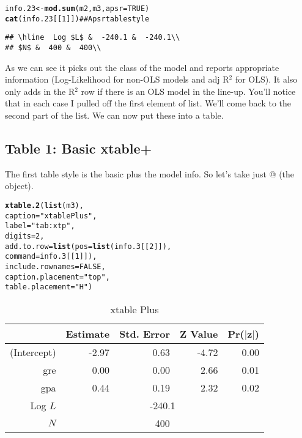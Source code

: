 \documentclass{article}\usepackage{graphicx, color}
\makeatletter
\newcommand{\hlfunctioncall}[1]{\textcolor[rgb]{0.501960784313725,0,0.329411764705882}{\textbf{#1}}}%
\newcommand{\hlstring}[1]{\textcolor[rgb]{0.6,0.6,1}{#1}}%
\newcommand{\hlcomment}[1]{\textcolor[rgb]{0.180392156862745,0.6,0.341176470588235}{#1}}%
\newenvironment{kframe}{%
 \def\at@end@of@kframe{}%
 \ifinner\ifhmode%
  \def\at@end@of@kframe{\end{minipage}}%
  \begin{minipage}{\columnwidth}%
 \fi\fi%
 \def\FrameCommand##1{\hskip\@totalleftmargin \hskip-\fboxsep
 \colorbox{shadecolor}{##1}\hskip-\fboxsep
     \hskip-\linewidth \hskip-\@totalleftmargin \hskip\columnwidth}%
 \MakeFramed {\advance\hsize-\width
   \@totalleftmargin\z@ \linewidth\hsize
   \@setminipage}}%
 {\par\unskip\endMakeFramed%
 \at@end@of@kframe}
\newenvironment{knitrout}{}{} %
\makeatother
\begin{document}
\begin{knitrout}
\begin{kframe}
\begin{alltt}
info.23<-\hlfunctioncall{mod.sum}(m2, m3, apsr=TRUE)
\hlfunctioncall{cat}(info.23[[1]]) \hlcomment{##Apsrtable style}
\end{alltt}
\begin{verbatim}
## \hline  Log $L$ &  -240.1 &  -240.1\\
## $N$ &  400 &  400\\
\end{verbatim}
\end{kframe}
\end{knitrout}

As we can see it picks out the class of the model and reports appropriate information (Log-Likelihood for non-OLS models and adj R$^2$ for OLS).  It also only adds in the R$^2$ row if there is an OLS model in the line-up.  You'll notice that in each case I pulled off the first element of list.  We'll come back to the second part of the list.  We can now put these into a table.
\subsection{Table 1: Basic xtable+}
The first table style is the basic \verb@xtable@ plus the model info.  So let's take just @ (the \verb@maxLik@ object).
\begin{kframe}
\begin{alltt}
\hlfunctioncall{xtable.2}(\hlfunctioncall{list}(m3),
         caption=\hlstring{"xtable Plus"},
         label=\hlstring{"tab:xtp"},  
         digits=2,
         add.to.row=\hlfunctioncall{list}(pos=\hlfunctioncall{list}(info.3[[2]]),
                         command=info.3[[1]]),
         include.rownames=FALSE,
         caption.placement=\hlstring{"top"},
         table.placement=\hlstring{"H"})
\end{alltt}
\end{kframe}
\begin{table}[H]
\begin{center}
\caption{xtable Plus}
\label{tab:xtp}
\begin{tabular}{rrrrr}
  \hline
  & Estimate & Std. Error & Z Value & Pr($|$z$|$) \\ 
  \hline
(Intercept) & -2.97 & 0.63 & -4.72 & 0.00 \\ 
  gre & 0.00 & 0.00 & 2.66 & 0.01 \\ 
  gpa & 0.44 & 0.19 & 2.32 & 0.02 \\ 
   \hline Log $L$ & \multicolumn{4}{c}{-240.1}\\
$N$ & \multicolumn{4}{c}{400}\\
 \hline
\end{tabular}
\end{center}
\end{table}
\end{document}
